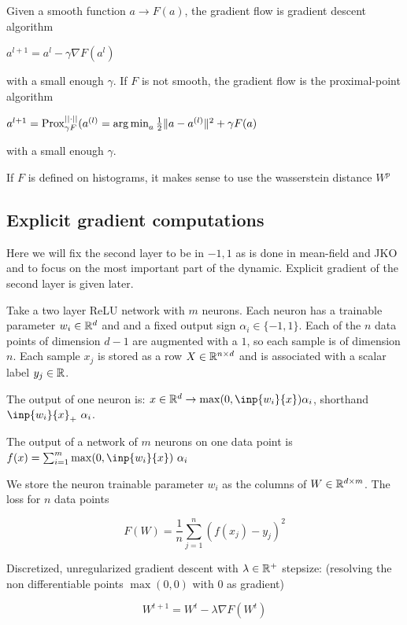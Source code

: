 Given a smooth function $a \rightarrow F(a)$, the gradient flow is gradient descent algorithm

$a^{l+1} = a^l - \gamma \nabla F(a^l)$

with a small enough $\gamma$. If $F$ is not smooth, the gradient flow is the proximal-point algorithm

$a^{l+1} = \operatorname{Prox}^{||\cdot ||}_{\gamma F}(a^{(l)} = \operatorname*{arg\,min}_a \frac{1}{2} \lVert a - a^{(l)}\rVert^2 + \gamma F(a)$

with a small enough $\gamma$.

If $F$ is defined on histograms, it makes sense to use the wasserstein distance $W^p$

\subsection{Explicit gradient computations}


Here we will fix the second layer to be in ${-1, 1}$ as is done in mean-field and JKO and to focus on the most important part of the dynamic. Explicit gradient of the second layer is given later.


Take a two layer ReLU network with $m$ neurons. Each neuron has a trainable parameter $w_i \in \mathbb{R}^d$ and and a fixed output sign $\alpha_i \in \{-1, 1\}$. Each of the $n$ data points of dimension $d-1$ are augmented with a $1$, so each sample is of dimension $n$. Each sample $x_j$ is stored as a row $X \in \mathbb{R}^{n \times d}$  and is associated with a scalar label $y_j \in \mathbb{R}$.

The output of one neuron is: $x \in \R^d \rightarrow \max(0, \inp{w_i}{x}) \alpha_i$, shorthand $\inp{w_i}{x}_+ ~ \alpha_i$.

The output of a network of $m$ neurons on one data point is $f(x) = \sum_{i=1}^{m} \max(0, \inp{w_i}{x}) ~ \alpha_i$

We store the neuron trainable parameter $w_i$ as the columns of $W \in \mathbb{R}^{d \times m}$. The loss for $n$ data points

\begin{equation}
	F(W) = \frac{1}{n} \sum_{j=1}^{n} \left(f(x_j) - y_j\right)^2
\end{equation}

Discretized, unregularized gradient descent with $\lambda \in \mathbb{R}^+$ stepsize: (resolving the non differentiable points $\max(0, 0)$ with 0 as gradient)

\begin{equation}
	W^{t+1} = W^t - \lambda \nabla F(W^t)
\end{equation}

